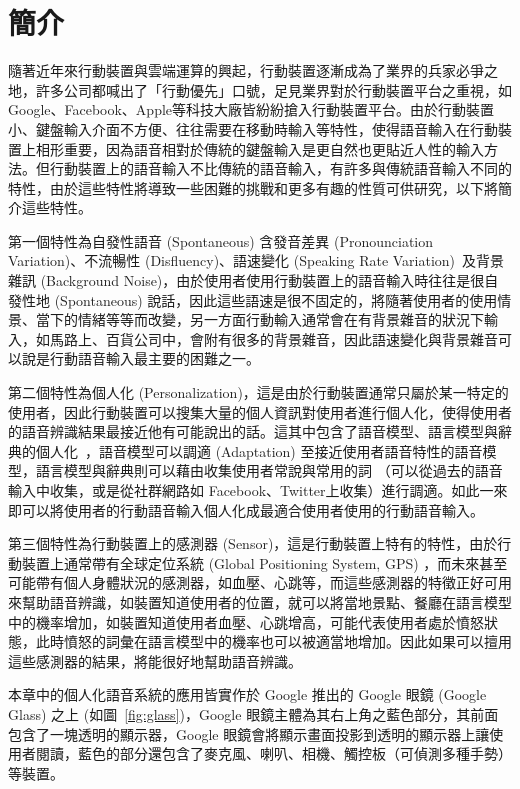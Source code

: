 \section{簡介}
隨著近年來行動裝置與雲端運算的興起，行動裝置逐漸成為了業界的兵家必爭之地，許多公司都喊出了「行動優先」口號，足見業界對於行動裝置平台之重視，如Google、Facebook、Apple等科技大廠皆紛紛搶入行動裝置平台。由於行動裝置小、鍵盤輸入介面不方便、往往需要在移動時輸入等特性，使得語音輸入在行動裝置上相形重要，因為語音相對於傳統的鍵盤輸入是更自然也更貼近人性的輸入方法。但行動裝置上的語音輸入不比傳統的語音輸入，有許多與傳統語音輸入不同的特性，由於這些特性將導致一些困難的挑戰和更多有趣的性質可供研究，以下將簡介這些特性。

第一個特性為自發性語音 (Spontaneous) 含發音差異 (Pronounciation Variation)、不流暢性 (Disfluency)、語速變化 (Speaking Rate Variation)~\cite{DBLP:conf/interspeech/YehLL13}及背景雜訊 (Background Noise)，由於使用者使用行動裝置上的語音輸入時往往是很自發性地 (Spontaneous) 說話，因此這些語速是很不固定的，將隨著使用者的使用情景、當下的情緒等等而改變，另一方面行動輸入通常會在有背景雜音的狀況下輸入，如馬路上、百貨公司中，會附有很多的背景雜音，因此語速變化與背景雜音可以說是行動語音輸入最主要的困難之一。

第二個特性為個人化 (Personalization)，這是由於行動裝置通常只屬於某一特定的使用者，因此行動裝置可以搜集大量的個人資訊對使用者進行個人化，使得使用者的語音辨識結果最接近他有可能說出的話。這其中包含了語音模型、語言模型與辭典的個人化~\cite{DBLP:conf/interspeech/WenHLTL13, wen2012personalized, bellegarda2004statistical}，語音模型可以調適 (Adaptation) 至接近使用者語音特性的語音模型，語言模型與辭典則可以藉由收集使用者常說與常用的詞
（可以從過去的語音輸入中收集，或是從社群網路如 Facebook、Twitter上收集）進行調適。如此一來即可以將使用者的行動語音輸入個人化成最適合使用者使用的行動語音輸入。

第三個特性為行動裝置上的感測器 (Sensor)，這是行動裝置上特有的特性，由於行動裝置上通常帶有全球定位系統 (Global Positioning System, GPS)
，而未來甚至可能帶有個人身體狀況的感測器，如血壓、心跳等，而這些感測器的特徵正好可用來幫助語音辨識，如裝置知道使用者的位置，就可以將當地景點、餐廳在語言模型中的機率增加，如裝置知道使用者血壓、心跳增高，可能代表使用者處於憤怒狀態，此時憤怒的詞彙在語言模型中的機率也可以被適當地增加。因此如果可以擅用這些感測器的結果，將能很好地幫助語音辨識。

本章中的個人化語音系統的應用皆實作於 Google 推出的 Google 眼鏡 (Google Glass) 之上 (如圖~\ref{fig:glass})，Google 眼鏡主體為其右上角之藍色部分，其前面包含了一塊透明的顯示器，Google 眼鏡會將顯示畫面投影到透明的顯示器上讓使用者閱讀，藍色的部分還包含了麥克風、喇叭、相機、觸控板（可偵測多種手勢）等裝置。

